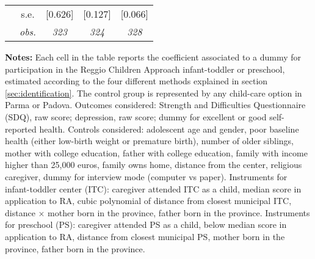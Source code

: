 \begin{table}[H]
\begin{centering}
\begin{tabular}{ r c ccc}
	 & s.e.	 & [0.626]	 & [0.127]	 & [0.066]	\\
	 & \textit{obs.}	 & \textit{323}	 & \textit{324}	 & \textit{328}	\\
\hline		
\end{tabular}		
\par\end{centering}		
\vspace{2ex}					
\begin{footnotesize}
\textbf{Notes:} Each cell in the table reports the coefficient associated to a dummy for participation in the Reggio Children Approach infant-toddler or preschool, estimated according to the four different methods explained in section  \ref{sec:identification}.
The control group is represented by any child-care option in Parma or Padova.
Outcomes considered: Strength and Difficulties Questionnaire (SDQ), raw score; depression, raw score; dummy for excellent or good self-reported health. Controls considered: adolescent age and gender, poor baseline health (either low-birth weight or premature birth), number of older siblings, mother with college education, father with college education, family with income higher than 25,000 euros, family owns home, distance from the center, religious caregiver, dummy for interview mode (computer vs paper). 
Instruments for infant-toddler center (ITC): caregiver attended ITC as a child, median score in application to RA, cubic polynomial of distance from closest municipal ITC, distance $\times$ mother born in the province, father born in the province.	Instruments for preschool (PS): caregiver attended PS as a child, below median score in application to RA, distance from closest municipal PS, mother born in the province, father born in the province.				
\end{footnotesize}					
\end{table}					
